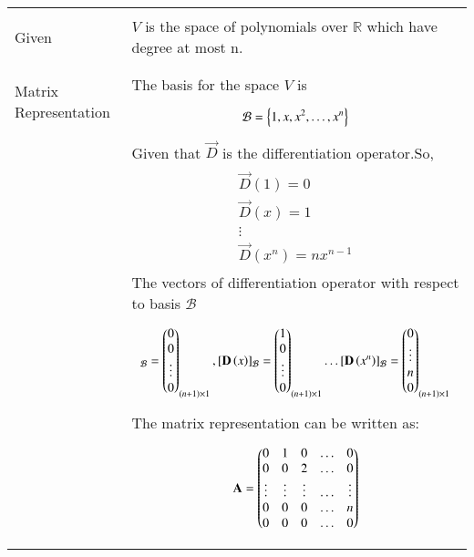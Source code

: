 \begin{longtable}{|l|l|}
	\hline
	\multirow{3}{*}{Given} & \\
	& $V$ is the space of polynomials over $\mathbb{R}$ which have degree at most n.\\
    & \\
    \hline
	\multirow{3}{*}{Matrix Representation}
	& \\
	& The basis for the space $V$ is \\
	&\parbox{10cm}
	{\begin{align}
	\mathcal{B}=\left\{1,x,x^2,\dots,x^n\right\}
	\end{align}}\\
	& Given that $\vec{D}$ is the differentiation operator.So,\\
	&\parbox{10cm}
	{\begin{align}
	\vec{D}(1)=0\\
	\vec{D}(x)=1\\
	\vdots \nonumber \\
	\vec{D}(x^n)=nx^{n-1}
	\end{align}}\\
	&The vectors of differentiation operator with respect to basis $\mathcal{B}$ \\
	&\parbox{10cm}
	{\begin{align}
	[\vec{D}\brak{1}]_{\mathcal{B}}=\myvec{0\\0\\\vdots\\0}_{(n+1)\times 1},
	[\vec{D}\brak{x}]_{\mathcal{B}}=\myvec{1\\0\\\vdots\\0}_{(n+1)\times 1} \dots
	[\vec{D}\brak{x^n}]_{\mathcal{B}}=\myvec{0\\\vdots\\n\\0}_{(n+1)\times 1}
	\end{align}}\nonumber\\
	&The matrix representation can be written as:\\
	&\parbox{10cm}
	{\begin{align}
	\mathbf{A}=
	\begin{pmatrix}0&1&0&\dots&0\\
	0&0&2&\dots&0\\
	\vdots & \vdots & \vdots & \dots & \vdots\\
	0&0&0&\dots&n\\
	0&0&0&\dots&0\end{pmatrix}
	\end{align}}\\
	&\\

\end{longtable}
